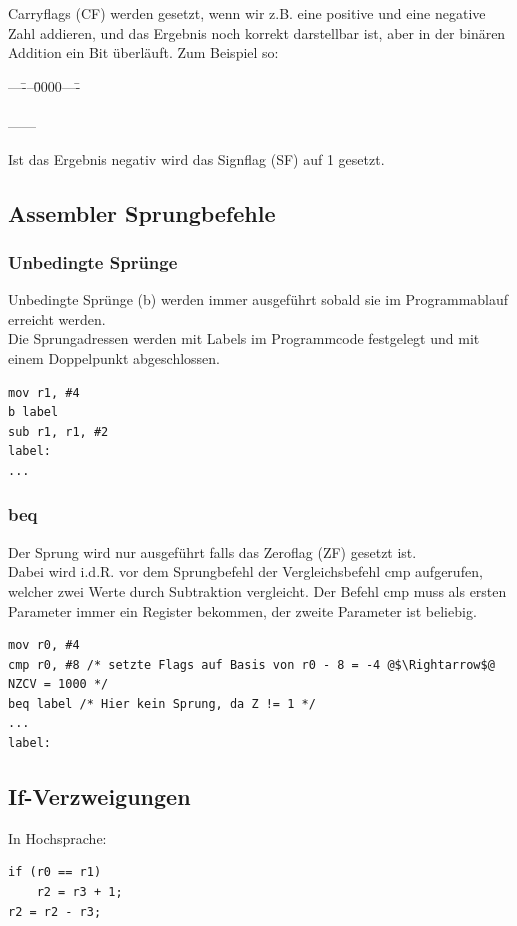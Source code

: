 \documentclass[a4paper,12pt,leqno]{article}
\begin{document}
Carryflags (CF) werden gesetzt, wenn wir z.B. eine positive und eine negative Zahl addieren, und das Ergebnis noch korrekt darstellbar ist, aber in der binären Addition ein Bit überläuft. Zum Beispiel so:
\begin{tabbing}
---\=---\=0000----\=\kill
\>\\
\>\\
\>\>------\\
\end{tabbing}

Ist das Ergebnis negativ wird das Signflag (SF) auf 1 gesetzt.

\subsection{Assembler Sprungbefehle}

\subsubsection{Unbedingte Sprünge}
Unbedingte Sprünge (b) werden immer ausgeführt sobald sie im Programmablauf erreicht werden.\\
Die Sprungadressen werden mit Labels im Programmcode festgelegt und mit einem Doppelpunkt abgeschlossen.
\begin{lstlisting}
mov r1, #4
b label
sub r1, r1, #2
label:
...
\end{lstlisting}

\subsubsection{beq}
Der Sprung wird nur ausgeführt falls das Zeroflag (ZF) gesetzt ist.\\
Dabei wird i.d.R. vor dem Sprungbefehl der Vergleichsbefehl cmp aufgerufen, welcher zwei Werte durch Subtraktion vergleicht.
Der Befehl cmp muss als ersten Parameter immer ein Register bekommen, der zweite Parameter ist beliebig.
\begin{lstlisting}
mov r0, #4
cmp r0, #8 /* setzte Flags auf Basis von r0 - 8 = -4 @$\Rightarrow$@ NZCV = 1000 */
beq label /* Hier kein Sprung, da Z != 1 */
...
label:
\end{lstlisting}

\subsection{If-Verzweigungen}
In Hochsprache:
\begin{lstlisting}
if (r0 == r1)
	r2 = r3 + 1;
r2 = r2 - r3;
\end{lstlisting}
\end{document}
